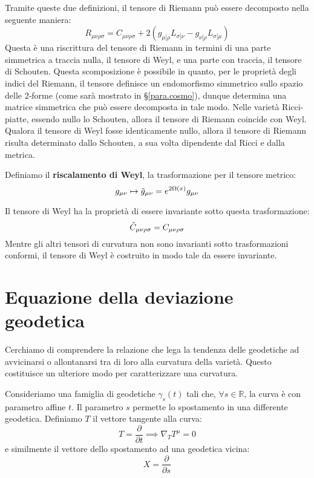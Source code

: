 Tramite queste due definizioni, il tensore di Riemann può essere decomposto nella seguente maniera:
\begin{equation}
    R_{\mu\nu\rho\sigma} = C_{\mu\nu\rho\sigma} + 2 \left(g_{\mu[\rho} L_{\sigma]\nu} - g_{\nu[\rho} L_{\sigma]\mu}\right)
    \label{eq.decomposizione_riemann_weyl}
\end{equation}
Questa è una riscrittura del tensore di Riemann in termini di una parte simmetrica a traccia nulla, il tensore di Weyl, e una parte con traccia, il tensore di Schouten. Questa scomposizione è possibile in quanto, per le proprietà degli indici del Riemann, il tensore definisce un endomorfismo simmetrico sullo spazio delle 2-forme (come sarà mostrato in \S\ref{para.cosmo}), dunque determina una matrice simmetrica che può essere decomposta in tale modo. Nelle varietà Ricci-piatte, essendo nullo lo Schouten, allora il tensore di Riemann coincide con Weyl. Qualora il tensore di Weyl fosse identicamente nullo, allora il tensore di Riemann risulta determinato dallo Schouten, a sua volta dipendente dal Ricci e dalla metrica.

\begin{definizione}
    Definiamo il \textbf{riscalamento di Weyl}, la trasformazione per il tensore metrico:
    \begin{equation}
        g_{\mu\nu} \mapsto \Tilde{g}_{\mu\nu} = e^{2\Omega(x)}g_{\mu\nu}
        \label{eq.riscalam_weyl}
    \end{equation}
\end{definizione}
Il tensore di Weyl ha la proprietà di essere invariante sotto questa trasformazione:
\begin{equation*}
    \Tilde{C}_{\mu\nu\rho\sigma} = C_{\mu\nu\rho\sigma}
\end{equation*}
Mentre gli altri tensori di curvatura non sono invarianti sotto trasformazioni conformi, il tensore di Weyl è costruito in modo tale da essere invariante.

\section{Equazione della deviazione geodetica}
Cerchiamo di comprendere la relazione che lega la tendenza delle geodetiche ad avvicinarsi o allontanarsi tra di loro alla curvatura della varietà. Questo costituisce un ulteriore modo per caratterizzare una curvatura.

Consideriamo una famiglia di geodetiche $\gamma_s(t)$ tali che, $\forall s \in \mathbb{R}$, la curva è con parametro affine $t$. Il parametro $s$ permette lo spostamento in una differente geodetica. Definiamo $T$ il vettore tangente alla curva:
\begin{equation*}
    T=\frac{\partial}{\partial t} \implies \nabla_T T^\mu = 0
\end{equation*}
e similmente il vettore dello spostamento ad una geodetica vicina:
\begin{equation*}
    X=\frac{\partial}{\partial s}
\end{equation*}

